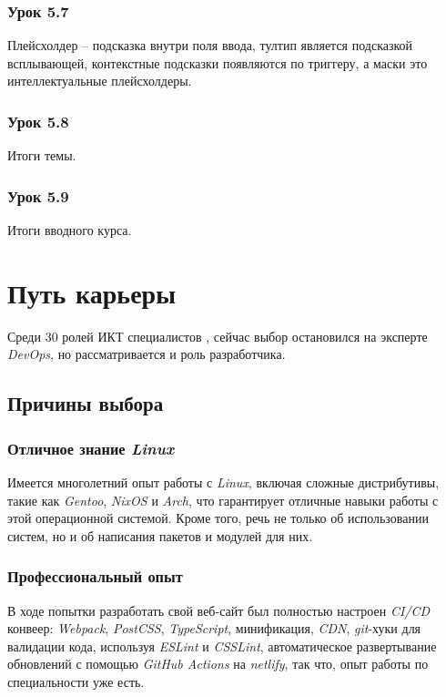 \documentclass[variant=practice]{bsuir}
\begin{document}
\subsection{Урок 5.7} Плейсхолдер -- подсказка внутри поля ввода, тултип
является подсказкой всплывающей, контекстные подсказки появляются по триггеру, а
маски это интеллектуальные плейсхолдеры.

\subsection{Урок 5.8} Итоги темы.

\subsection{Урок 5.9} Итоги вводного курса.

\chapter{Путь карьеры}

Среди 30 ролей ИКТ специалистов \cite{majors}, сейчас выбор остановился на
эксперте \textit{DevOps}, но рассматривается и роль разработчика.

\section{Причины выбора}

\subsection{Отличное знание \textit{Linux}} Имеется многолетний опыт работы с
\textit{Linux}, включая сложные дистрибутивы, такие как \textit{Gentoo},
\textit{NixOS} и \textit{Arch}, что гарантирует отличные навыки работы с этой
операционной системой. Кроме того, речь не только об использовании систем, но и
об написания пакетов и модулей для них.

\subsection{Профессиональный опыт} В ходе попытки разработать свой веб-сайт был
полностью настроен \textit{CI/CD} конвеер: \textit{Webpack}, \textit{PostCSS},
\textit{TypeScript}, минификация, \textit{CDN}, \textit{git}-хуки для валидации
кода, используя \textit{ESLint} и \textit{CSSLint}, автоматическое развертывание
обновлений с помощью \textit{GitHub Actions} на \textit{netlify}, так что, опыт
работы по специальности уже есть.
\end{document}
